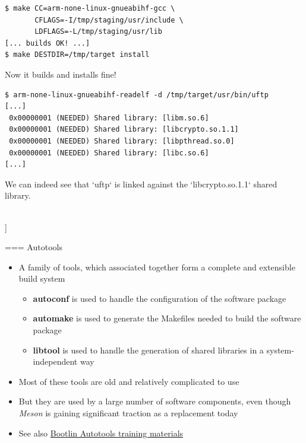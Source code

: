   \begin{block}{}
    {\tiny
\begin{verbatim}
$ make CC=arm-none-linux-gnueabihf-gcc \
       CFLAGS=-I/tmp/staging/usr/include \
       LDFLAGS=-L/tmp/staging/usr/lib
[... builds OK! ...]
$ make DESTDIR=/tmp/target install
\end{verbatim}
    }
  \end{block}

  {\small Now it builds and installs fine!}

  \begin{block}{}
    {\tiny
\begin{verbatim}
$ arm-none-linux-gnueabihf-readelf -d /tmp/target/usr/bin/uftp
[...]
 0x00000001 (NEEDED) Shared library: [libm.so.6]
 0x00000001 (NEEDED) Shared library: [libcrypto.so.1.1]
 0x00000001 (NEEDED) Shared library: [libpthread.so.0]
 0x00000001 (NEEDED) Shared library: [libc.so.6]
[...]
\end{verbatim}
    }
  \end{block}

  {\small We can indeed see that `uftp` is linked against the
    `libcrypto.so.1.1` shared library.}

\\]


=== {Autotools}
  \begin{itemize}
  \item A family of tools, which associated together form a complete
    and extensible build system
    \begin{itemize}
    \item {\bf autoconf} is used to handle the configuration of the
      software package
    \item {\bf automake} is used to generate the Makefiles needed to
      build the software package
    \item {\bf libtool} is used to handle the generation of shared
      libraries in a system-independent way
    \end{itemize}
  \item Most of these tools are old and relatively complicated to use
  \item But they are used by a large number of software components,
    even though {\em Meson} is gaining significant traction as a
    replacement today
  \item See also
    \href{https://bootlin.com/doc/training/autotools/}{Bootlin
      Autotools training materials}
  \end{itemize}


